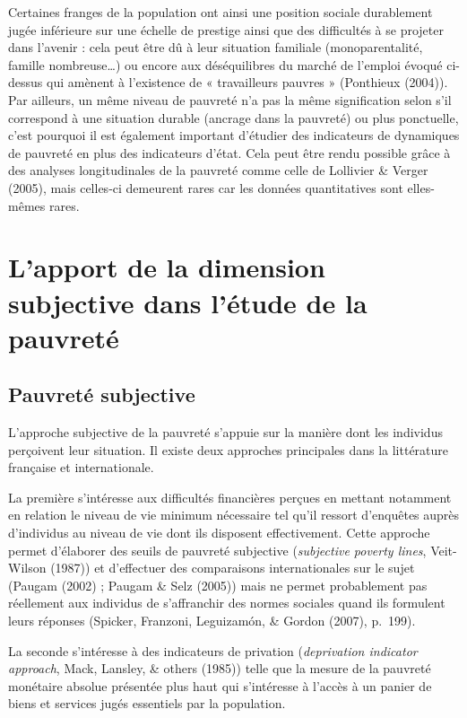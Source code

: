 \documentclass[12pt,a4paper]{reedthesis}
\begin{document}
Certaines franges de la population ont ainsi une position sociale durablement jugée inférieure sur une échelle de prestige ainsi que des difficultés à se projeter dans l'avenir : cela peut être dû à leur situation familiale (monoparentalité, famille nombreuse\ldots) ou encore aux déséquilibres du marché de l'emploi évoqué ci-dessus qui amènent à l'existence de « travailleurs pauvres » (Ponthieux (2004)). Par ailleurs, un même niveau de pauvreté n'a pas la même signification selon s'il correspond à une situation durable (ancrage dans la pauvreté) ou plus ponctuelle, c'est pourquoi il est également important d'étudier des indicateurs de dynamiques de pauvreté en plus des indicateurs d'état. Cela peut être rendu possible grâce à des analyses longitudinales de la pauvreté comme celle de Lollivier \& Verger (2005), mais celles-ci demeurent rares car les données quantitatives sont elles-mêmes rares.

\hypertarget{sec:pauvsubj}{%
\section{L'apport de la dimension subjective dans l'étude de la pauvreté}\label{sec:pauvsubj}}

\hypertarget{pauvretuxe9-subjective}{%
\subsection{Pauvreté subjective}\label{pauvretuxe9-subjective}}

L'approche subjective de la pauvreté s'appuie sur la manière dont les individus perçoivent leur situation. Il existe deux approches principales dans la littérature française et internationale.

La première s'intéresse aux difficultés financières perçues en mettant notamment en relation le niveau de vie minimum nécessaire tel qu'il ressort d'enquêtes auprès d'individus au niveau de vie dont ils disposent effectivement. Cette approche permet d'élaborer des seuils de pauvreté subjective (\emph{subjective poverty lines}, Veit-Wilson (1987)) et d'effectuer des comparaisons internationales sur le sujet (Paugam (2002) ; Paugam \& Selz (2005)) mais ne permet probablement pas réellement aux individus de s'affranchir des normes sociales quand ils formulent leurs réponses (Spicker, Franzoni, Leguizamón, \& Gordon (2007), p.~199).

La seconde s'intéresse à des indicateurs de privation (\emph{deprivation indicator approach}, Mack, Lansley, \& others (1985)) telle que la mesure de la pauvreté monétaire absolue présentée plus haut qui s'intéresse à l'accès à un panier de biens et services jugés essentiels par la population.
\end{document}
